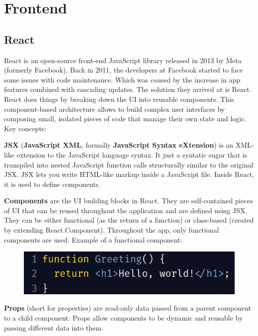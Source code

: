 \section{Frontend}

\subsection{React}

\par React is an open-source front-end JavaScript library released in 2013 by Meta (formerly Facebook). Back in 2011, the developers at Facebook started to face some issues with code maintenance. Which was caused by the increase in app features combined with cascading updates. The solution they arrived at is React. \cite{reactHistory} React does things by breaking down the UI into reusable components. This component-based architecture allows to build complex user interfaces by composing small, isolated pieces of code that manage their own state and logic. Key concepts:

\par \textbf{JSX} (\textbf{JavaScript XML}, formally \textbf{JavaScript Syntax eXtension}) is an XML-like extension to the JavaScript language syntax. \cite{jsx} It just a syntatic sugar that is transpiled into nested JavaScript function calls structurally similar to the original JSX. JSX lets you write HTML-like markup inside a JavaScript file. Inside React, it is used to define components.

\par \textbf{Components} are the UI building blocks in React. They are self-contained pieces of UI that can be reused throughout the application and are defined using JSX. They can be either functional (as the return of a function) or class-based (created by extending React.Component). Throughout the app, only functional components are used. Example of a functional component:

\begin{figure}[!ht]
    \centering
    \includegraphics[width=1\linewidth]{react-component-example.png}
\end{figure}

\par \textbf{Props} (short for properties) are read-only data passed from a parent component to a child component. Props allow components to be dynamic and reusable by passing different data into them.

